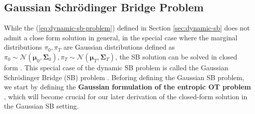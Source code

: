 \documentclass{article}
\begin{document}
\subsection{Gaussian Schrödinger Bridge Problem}
\label{subsec:gaussian-sb}

While the (\ref{eq:dynamic-sb-problem}) defined in Section \ref{sec:dynamic-sb} does not admit a close form solution in general, in the special case where the marginal distributions $\pi_0, \pi_T$ are Gaussian distributions defined as $\pi_0\sim \mathcal{N}(\boldsymbol{\mu}_0, \boldsymbol{\Sigma}_0), \pi_T\sim\mathcal{N}(\boldsymbol{\mu}_T, \boldsymbol{\Sigma}_T)$, the SB solution can be solved in closed form \citep{bunne2023schrodinger}. This special case of the dynamic SB problem is called the Gaussian Schrödinger Bridge (SB) problem \citep{bunne2023schrodinger, mallasto2022entropy}. Beforing defining the Gaussian SB problem, we start by defining the \textbf{Gaussian formulation of the entropic OT problem} \citep{bojilov2016matching, janati2020entropic, mallasto2022entropy}, which will become crucial for our later derivation of the closed-form solution in the Gaussian SB setting. 
\end{document}
